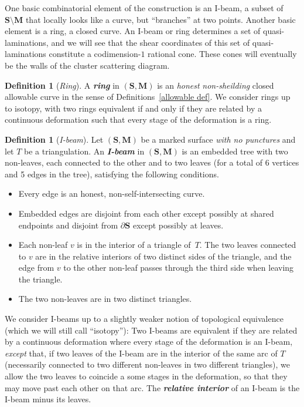 \documentclass{amsart}
\theoremstyle{definition}
\newtheorem{definition}[proposition]{Definition}
\theoremstyle{remark}
\numberwithin{equation}{section}
\newcommand{\newword}[1]{\textbf{\emph{#1}}}
\newcommand{\0}{{\mathbf{0}}}
\newcommand{\M}{\mathbf{M}}
\renewcommand{\S}{\mathbf{S}}
\begin{document}
One basic combinatorial element of the construction is an I-beam, a subset of $\S\setminus\M$ that locally looks like a curve, but ``branches'' at two points.
Another basic element is a ring, a closed curve.
An I-beam or ring determines a set of quasi-laminations, and we will see that the shear coordinates of this set of quasi-laminations constitute a codimension-$1$ rational cone. 
These cones will eventually be the walls of the cluster scattering diagram.

\begin{definition}[\emph{Ring}]\label{ring def}
A \newword{ring} in $(\S,\M)$ is an \emph{honest} \emph{non-sheilding} closed allowable curve in the sense of Definitions~\ref{allowable def}.
We consider rings up to isotopy, with two rings equivalent if and only if they are related by a continuous deformation such that every stage of the deformation is a ring.
\end{definition}

\begin{definition}[\emph{I-beam}]\label{def: i-beam no punct}
Let $(\S,\M)$ be a marked surface \emph{with no punctures} and let $T$ be a triangulation.
An \newword{I-beam} in $(\S,\M)$ is an embedded tree with two non-leaves, each connected to the other and to two leaves (for a total of 6 vertices and 5 edges in the tree), satisfying the following conditions.
\begin{itemize}
\item Every edge is an honest, non-self-intersecting curve.
\item Embedded edges are disjoint from each other except possibly at shared endpoints and disjoint from $\partial\S$ except possibly at leaves.
\item Each non-leaf $v$ is in the interior of a triangle of~$T$.
The two leaves connected to $v$ are in the relative interiors of two distinct sides of the triangle, and the edge from $v$ to the other non-leaf passes through the third side when leaving the triangle.
\item The two non-leaves are in two distinct triangles.
\end{itemize}
We consider I-beams up to a slightly weaker notion of topological equivalence (which we will still call ``isotopy''):
Two I-beams are equivalent if they are related by a continuous deformation where every stage of the deformation is an I-beam, \emph{except} that, if two leaves of the I-beam are in the interior of the same arc of $T$ (necessarily connected to two different non-leaves in two different triangles), we allow the two leaves to coincide a some stages in the deformation, so that they may move past each other on that arc.
The \newword{relative interior} of an I-beam is the I-beam minus its leaves.
\end{definition}
\end{document}
